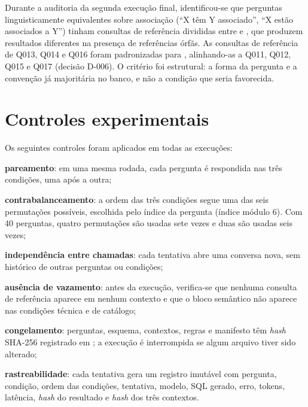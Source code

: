 Durante a auditoria da segunda execução final, identificou-se que
perguntas linguisticamente equivalentes sobre associação (``X têm Y
associado'', ``X estão associados a Y'') tinham consultas de referência
divididas entre  e , que produzem
resultados diferentes na presença de referências órfãs. As consultas de
referência de Q013, Q014 e Q016 foram padronizadas para ,
alinhando-as a Q011, Q012, Q015 e Q017 (decisão D-006). O critério foi
estrutural: a forma da pergunta e a convenção já majoritária no banco, e não
a condição que seria favorecida.

\section{Controles experimentais}
\label{sec:controles}

Os seguintes controles foram aplicados em todas as execuções:
\begin{alineas}
  \item \textbf{pareamento}: em uma mesma rodada, cada pergunta é
        respondida nas três condições, uma após a outra;
  \item \textbf{contrabalanceamento}: a ordem das três condições segue uma
        das seis permutações possíveis, escolhida pelo índice da pergunta
        (índice módulo 6). Com 40 perguntas, quatro permutações são usadas
        sete vezes e duas são usadas seis vezes;
  \item \textbf{independência entre chamadas}: cada tentativa abre uma
        conversa nova, sem histórico de outras perguntas ou condições;
  \item \textbf{ausência de vazamento}: antes da execução, verifica-se que
        nenhuma consulta de referência aparece em nenhum contexto e que o
        bloco semântico não aparece nas condições técnica e de catálogo;
  \item \textbf{congelamento}: perguntas, esquema, contextos, regras e
        manifesto têm \textit{hash} SHA-256 registrado em
        ; a execução é interrompida se algum arquivo
        tiver sido alterado;
  \item \textbf{rastreabilidade}: cada tentativa gera um registro
        imutável com pergunta, condição, ordem das condições, tentativa,
        modelo, SQL gerado, erro, tokens, latência, \textit{hash} do resultado
        e \textit{hash} dos três contextos.
\end{alineas}

